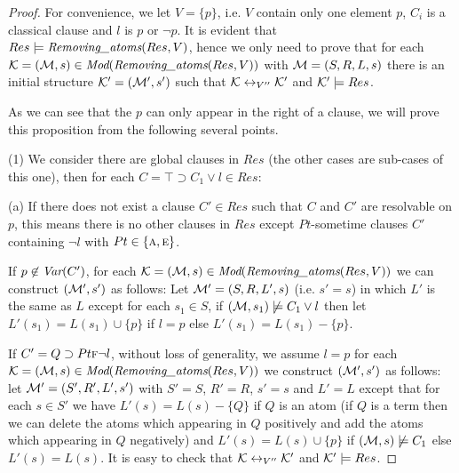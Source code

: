 \documentclass[letterpaper]{article}
\begin{document}
\begin{proof}
For convenience, we let $V=\{p\}$, i.e. $V$ contain only one element $p$, $C_i$ is a classical clause and $l$ is $p$ or $\neg p$.
It is evident that $Res \models \emph{Removing\_atoms}(Res, V)$, hence we only need to prove that for each ${\cal K}=({\cal M}, s)\in \textit{Mod}(\emph{Removing\_atoms}(Res, V))$ with ${\cal M}=(S, R, L, s)$ there is an initial structure ${\cal K}'=({\cal M}', s')$ such that ${\cal K} \leftrightarrow_{V''} {\cal K}'$ and ${\cal K}' \models Res$. 

As we can see that the $p$ can only appear in the right of a clause, we will prove this proposition from the following several points.

(1) We consider there are global clauses in $Res$ (the other cases are sub-cases of this one), then for each $C=\top\supset C_1 \vee l \in Res$:

(a) If there does not exist a clause $C'\in Res$ such that $C$ and $C'$ are resolvable on $p$, this means there is no other clauses in $Res$ except $Pt$-sometime clauses $C'$ containing $\neg l$ with $Pt\in \{\textsc{a}, \textsc{e}\}$. 

If $p\not \in \textit{Var}(C')$, for each ${\cal K}=({\cal M}, s)\in \textit{Mod}(\emph{Removing\_atoms}(Res, V))$ we can construct $({\cal M}',s')$ as follows: Let ${\cal M}'= (S, R, L',s)$ (i.e. $s'=s$) in which $L'$ is the same as $L$ except for each $s_1\in S$, if $({\cal M}, s_1) \not \models C_1 \vee l$ then let $L'(s_1) = L(s_1) \cup \{p\}$ if $l=p$ else $L'(s_1) = L(s_1) - \{p\}$.

If $C'= Q\supset Pt \textsc{f} \neg l$, without loss of generality, we assume $l=p$  for each ${\cal K}=({\cal M}, s)\in \textit{Mod}(\emph{Removing\_atoms}(Res, V))$ we construct $({\cal M}',s')$ as follows: let ${\cal M}'=(S', R', L', s')$ with $S'=S$, $R'=R$, $s'=s$ and $L'=L$ except that for each $s\in S'$ we have $L'(s) = L(s) - \{Q\}$ if $Q$ is an atom (if $Q$ is a term then we can delete the atoms which appearing in $Q$ positively and add the atoms which appearing in $Q$ negatively) and $L'(s) = L(s) \cup \{p\}$ if $({\cal M}, s) \not \models C_1$ else $L'(s) = L(s)$. 
It is easy to check that ${\cal K} \leftrightarrow_{V''} {\cal K}'$ and ${\cal K}' \models Res$. 


\end{proof}
\end{document}
